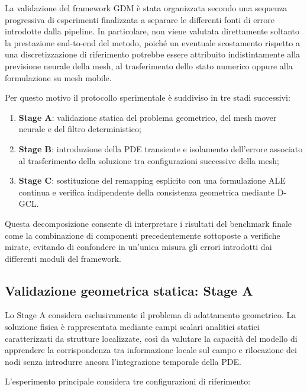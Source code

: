 La validazione del framework GDM è stata organizzata secondo una sequenza progressiva di esperimenti finalizzata a separare le differenti fonti di errore introdotte dalla pipeline. In particolare, non viene valutata direttamente soltanto la prestazione end-to-end del metodo, poiché un eventuale scostamento rispetto a una discretizzazione di riferimento potrebbe essere attribuito indistintamente alla previsione neurale della mesh, al trasferimento dello stato numerico oppure alla formulazione su mesh mobile.

Per questo motivo il protocollo sperimentale è suddiviso in tre stadi successivi:

\begin{enumerate}
    \item \textbf{Stage A}: validazione statica del problema geometrico, del mesh mover neurale e del filtro deterministico;

    \item \textbf{Stage B}: introduzione della PDE transiente e isolamento dell'errore associato al trasferimento della soluzione tra configurazioni successive della mesh;

    \item \textbf{Stage C}: sostituzione del remapping esplicito con una formulazione ALE continua e verifica indipendente della consistenza geometrica mediante D-GCL.
\end{enumerate}

Questa decomposizione consente di interpretare i risultati del benchmark finale come la combinazione di componenti precedentemente sottoposte a verifiche mirate, evitando di confondere in un'unica misura gli errori introdotti dai differenti moduli del framework.

\subsection{Validazione geometrica statica: Stage A}

\label{subsec:stage_a_results}

Lo Stage A considera esclusivamente il problema di adattamento geometrico. La soluzione fisica è rappresentata mediante campi scalari analitici statici caratterizzati da strutture localizzate, così da valutare la capacità del modello di apprendere la corrispondenza tra informazione locale sul campo e rilocazione dei nodi senza introdurre ancora l'integrazione temporale della PDE.

L'esperimento principale considera tre configurazioni di riferimento:

